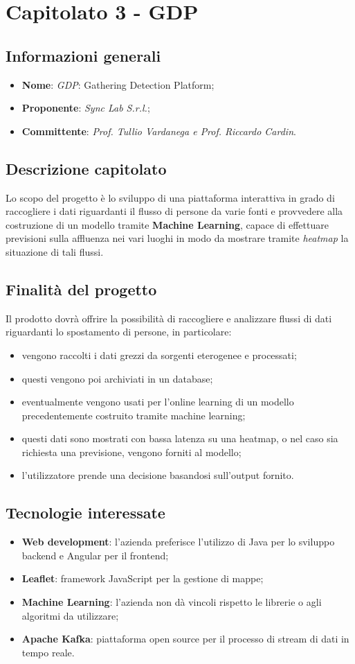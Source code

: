 \section{Capitolato 3 - GDP}
\subsection{Informazioni generali}
\begin{itemize}
    \item \textbf{Nome}: \emph{GDP}: Gathering Detection Platform;
    \item \textbf{Proponente}: \emph{Sync Lab S.r.l.};
    \item \textbf{Committente}: \emph{Prof. Tullio Vardanega e Prof. Riccardo Cardin}.
\end{itemize}
\subsection{Descrizione capitolato}
Lo scopo del progetto è lo sviluppo di una piattaforma interattiva in grado di raccogliere i dati riguardanti il flusso di persone da varie fonti e provvedere alla costruzione di un modello tramite \textbf{Machine Learning}, capace di effettuare previsioni sulla affluenza nei vari luoghi in modo da mostrare tramite \emph{heatmap} la situazione di tali flussi.
\subsection{Finalità del progetto}
Il prodotto dovrà offrire la possibilità di raccogliere e analizzare flussi di dati riguardanti lo spostamento di persone, in particolare:
\begin{itemize}
    \item vengono raccolti i dati grezzi da sorgenti eterogenee e processati;
    \item questi vengono poi archiviati in un database;
    \item eventualmente vengono usati per l'online learning di un modello precedentemente costruito tramite machine learning;
    \item questi dati sono mostrati con bassa latenza su una heatmap, o nel caso sia richiesta una previsione, vengono forniti al modello;
    \item l'utilizzatore prende una decisione basandosi sull'output fornito.
\end{itemize}
\subsection{Tecnologie interessate}
\begin{itemize}
    \item \textbf{Web development}: l'azienda preferisce l'utilizzo di Java per lo sviluppo backend e Angular per il frontend;
    \item \textbf{Leaflet}: framework JavaScript per la gestione di mappe;
    \item \textbf{Machine Learning}: l'azienda non dà vincoli rispetto le librerie o agli algoritmi da utilizzare;
    \item \textbf{Apache Kafka}: piattaforma open source per il processo di stream di dati in tempo reale.
\end{itemize}
